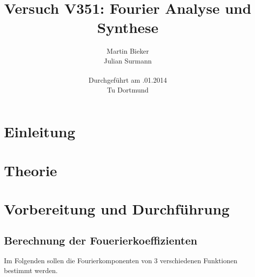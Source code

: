 \documentclass[11pt,ngerman,a4paper]{article}
\title{\textbf{Versuch V351: Fourier Analyse und Synthese}}
\author{Martin Bieker\\
		Julian Surmann\\
		\\
		Durchgef\"{u}hrt am .01.2014\\
		Tu Dortmund}
\date{}
\begin{document}
\renewcommand\tablename{Tabelle}
\renewcommand\figurename{Abbildung}
\maketitle
\thispagestyle{empty}
\newpage
\clearpage
\setcounter{page}{1}


\section{Einleitung}

\section{Theorie}

\section{Vorbereitung und Durchf\"{u}hrung}
\subsection{Berechnung der Fouerierkoeffizienten}
Im Folgenden sollen die Fourierkomponenten von 3 verschiedenen Funktionen bestimmt werden. 
\end{document}
